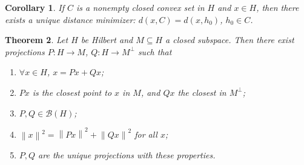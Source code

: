 \documentclass[12pt]{article}
\newcommand{\norm}[1]{\left\| #1 \right\|}
\newcommand{\cB}{\mathcal{B}}
\newtheorem{thm}{Theorem}[section]
\newtheorem{cor}[thm]{Corollary}
\theoremstyle{definition}
\begin{document}
\begin{cor}
	If $C$ is a nonempty closed convex set in $H$ and $x \in H$, then there exists a unique distance minimizer: $d(x,C) = d(x,h_0)$, $h_0 \in C$.
\end{cor}

\begin{thm}
	Let $H$ be Hilbert and $M \subseteq H$ a closed subspace.
	Then there exist projections $P : H \to M$, $Q : H \to M^\perp$ such that
	\begin{enumerate}[label=(\roman*),nosep]
		\item $\forall x \in H$, $x = Px + Qx$;
		\item $Px$ is the closest point to $x$ in $M$, and $Qx$ the closest in $M^\perp$;
		\item $P, Q \in \cB(H)$;
		\item $\norm{x}^2 = \norm{Px}^2 + \norm{Qx}^2$ for all $x$;
		\item $P, Q$ are the unique projections with these properties.
	\end{enumerate}
\end{thm}
\end{document}
